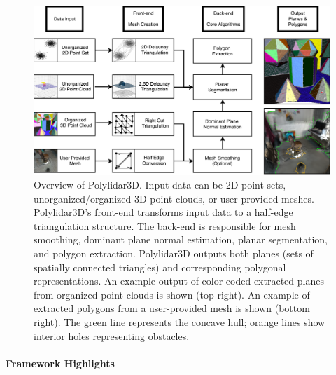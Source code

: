 \begin{figure}[ht]
    \centering
    \includegraphics[width=.95\linewidth]{chapter_3_polylidar3d/imgs/Polylidar3DArchitecture-SimplifedV4.pdf}
    \caption{Overview of Polylidar3D. Input data can be 2D point sets, unorganized/organized 3D point clouds, or user-provided meshes. Polylidar3D's front-end transforms input data to a half-edge triangulation structure. The back-end is responsible for mesh smoothing, dominant plane normal estimation, planar segmentation, and polygon extraction. Polylidar3D outputs both planes (sets of spatially connected triangles) and corresponding polygonal representations. An example output of color-coded extracted planes from organized point clouds is shown (top right). An example of extracted polygons from a user-provided mesh is shown (bottom right). The green line represents the concave hull; orange lines show interior holes representing obstacles.} %
    \label{fig:ch3_polylidar_overview}
\end{figure}


\paragraph{Framework Highlights}

